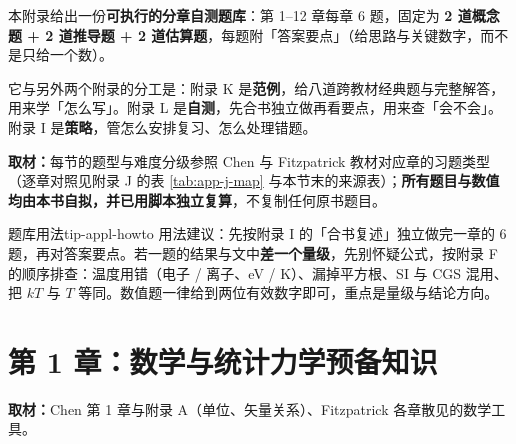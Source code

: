 
\newcommand{\tkans}[1]{\par\vspace{0.5pt}{\small\textbf{答案：}#1}\par}
\newcommand{\tksrc}[1]{{\small\textbf{取材：}#1}\par\vspace{1pt}}

本附录给出一份\textbf{可执行的分章自测题库}：第 1--12 章每章 6 题，固定为 \textbf{2 道概念题 + 2 道推导题 + 2 道估算题}，每题附「答案要点」（给思路与关键数字，而不是只给一个数）。

它与另外两个附录的分工是：附录 K 是\textbf{范例}，给八道跨教材经典题与完整解答，用来学「怎么写」。附录 L 是\textbf{自测}，先合书独立做再看要点，用来查「会不会」。附录 I 是\textbf{策略}，管怎么安排复习、怎么处理错题。

\tksrc{每节的题型与难度分级参照 Chen 与 Fitzpatrick 教材对应章的习题类型（逐章对照见附录 J 的表 \ref{tab:app-j-map} 与本节末的来源表）；\textbf{所有题目与数值均由本书自拟，并已用脚本独立复算}，不复制任何原书题目。}

\begin{tip}{题库用法}{tip-appl-howto}
用法建议：先按附录 I 的「合书复述」独立做完一章的 6 题，再对答案要点。若一题的结果与文中\textbf{差一个量级}，先别怀疑公式，按附录 F 的顺序排查：温度用错（电子 / 离子、eV / K）、漏掉平方根、SI 与 CGS 混用、把 $kT$ 与 $T$ 等同。数值题一律给到两位有效数字即可，重点是量级与结论方向。
\end{tip}


\section{第 1 章：数学与统计力学预备知识}
\tksrc{Chen 第 1 章与附录 A（单位、矢量关系）、Fitzpatrick 各章散见的数学工具。}

